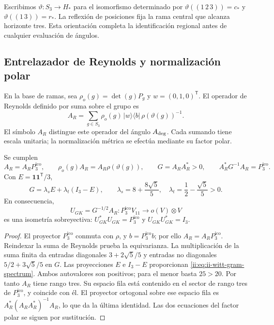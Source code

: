 Escribimos \(\vartheta:S_3\to H_*\) para el isomorfismo determinado
por \(\vartheta((1\,2\,3))=c_*\) y
\(\vartheta((1\,3))=r_*\). La reflexión de posiciones fija la rama
central que alcanza horizonte tres. Esta orientación completa la
identificación regional antes de cualquier evaluación de ángulos.

\subsection{Entrelazador de Reynolds y normalización polar}

En la base de ramas, sea \(\rho_o(g)=\det(g)P_g\) y
\(w=(0,1,0)^{\mathsf T}\). El operador de Reynolds definido por suma
sobre el grupo es
\begin{equation}
 A_R=\sum_{g\in S_3}\rho_o(g)\,|w\rangle\langle b|\,
                       \rho(\vartheta(g))^{-1}.
 \label{ii:eq:ii-witt-reynolds}
\end{equation}
El símbolo \(A_R\) distingue este operador del ángulo
\(A_{\rm deg}\). Cada sumando tiene escala unitaria; la normalización
métrica se efectúa mediante su factor polar.

\begin{proposition}
\label{ii:prop:ii-witt-polar}
Se cumplen
\[
 A_R=A_RP_3^{\mathrm{ico}},\qquad
 \rho_o(g)A_R=A_R\rho(\vartheta(g)),\qquad
 G=A_RA_R^*>0,\qquad A_R^*G^{-1}A_R=P_3^{\mathrm{ico}}.
\]
Con \(E=\mathbf1\mathbf1^{\mathsf T}/3\),
\begin{equation}
 G=\lambda_sE+\lambda_t(I_3-E),\qquad
 \lambda_s=8+\frac{8\sqrt5}{5},\quad
 \lambda_t=\frac12-\frac{\sqrt5}{5}>0.
 \label{ii:eq:ii-witt-gram-spectrum}
\end{equation}
En consecuencia,
\[
 U_{GK}=G^{-1/2}A_R:P_3^{\mathrm{ico}}V_{11}\longrightarrow o(V)\otimes V
\]
es una isometría sobreyectiva:
\(U_{GK}^*U_{GK}=P_3^{\mathrm{ico}}\) y \(U_{GK}U_{GK}^*=I_3\).
\end{proposition}
\begin{proof}
El proyector \(P_3^{\mathrm{ico}}\) conmuta con \(\rho\), y \(b=P_3^{\mathrm{ico}}b\);
por ello \(A_R=A_RP_3^{\mathrm{ico}}\). Reindexar la suma de Reynolds prueba la
equivarianza. La multiplicación de la suma finita da entradas diagonales
\(3+2\sqrt5/5\) y entradas no diagonales
\(5/2+3\sqrt5/5\) en \(G\). Las proyecciones \(E\) e \(I_3-E\)
proporcionan \eqref{ii:eq:ii-witt-gram-spectrum}. Ambos autovalores son
positivos; para el menor basta \(25>20\). Por tanto \(A_R\) tiene
rango tres. Su espacio fila está contenido en el sector de rango tres
de \(P_3^{\mathrm{ico}}\), y coincide con él. El proyector ortogonal sobre ese espacio
fila es \(A_R^*(A_RA_R^*)^{-1}A_R\), lo que da la última identidad.
Las dos ecuaciones del factor polar se siguen por sustitución.
\end{proof}


